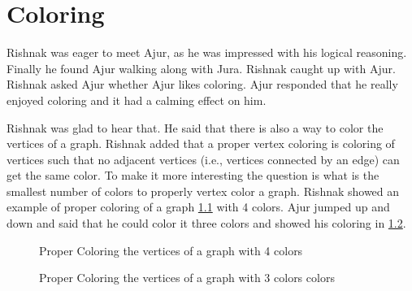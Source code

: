 \chapter{Coloring}
Rishnak was eager to meet Ajur, as he was impressed with his logical reasoning. Finally he found Ajur walking along with Jura. Rishnak caught up with Ajur. Rishnak asked Ajur whether Ajur likes coloring. Ajur responded that he really enjoyed coloring and it had a calming effect on him.

Rishnak was glad to hear that. He said that there is also a way to color the vertices of a graph. Rishnak added that a proper vertex coloring is coloring of vertices such that no adjacent vertices (i.e., vertices connected by an edge) can get the same color. To make it more interesting the question is what is the smallest number of colors to properly vertex color a graph. 
Rishnak showed an example of proper coloring of a graph \ref{10g1} with 4 colors. Ajur jumped up and down and said that he could color it three colors and showed his coloring in \ref{10g2}.
\begin{figure}[h]
\begin{center}
\caption{ Proper Coloring the vertices of a graph with 4 colors}\label{10g1}
\end{center}
\end{figure}

\begin{figure}[h]
\begin{center}
\caption{ Proper Coloring the vertices of a graph with 3 colors colors}\label{10g2}
\end{center}
\end{figure}

